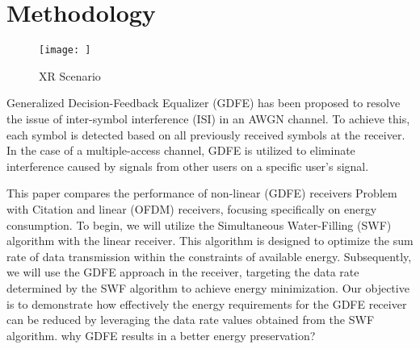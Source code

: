 \section{Methodology}

\begin{figure}
    \centering
    \texttt{[image: ]}
    \caption{XR Scenario}
    \label{fig:xr}
\end{figure}


Generalized Decision-Feedback Equalizer (GDFE) has been proposed to resolve the issue of inter-symbol interference (ISI) in an AWGN channel. To achieve this, each symbol is detected based on all previously received symbols at the receiver\cite{yu2004sum}. In the case of a multiple-access channel, GDFE is utilized to eliminate interference caused by signals from other users on a specific user's signal.

This paper compares the performance of non-linear (GDFE) receivers \cite{GDFE} {\color{red} Problem with Citation} and linear (OFDM) receivers\cite{chang1966synthesis}, focusing specifically on energy consumption. To begin, we will utilize the Simultaneous Water-Filling (SWF) algorithm\cite{book} with the linear receiver. This algorithm is designed to optimize the sum rate of data transmission within the constraints of available energy. Subsequently, we will use the GDFE approach in the receiver, targeting the data rate determined by the SWF algorithm to achieve energy minimization. Our objective is to demonstrate how effectively the energy requirements for the GDFE receiver can be reduced by leveraging the data rate values obtained from the SWF algorithm. {\color{red} why GDFE results in a better energy preservation?}

